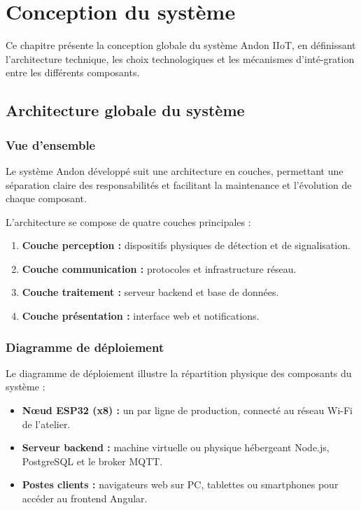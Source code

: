 \chapter{Conception du syst\`eme}

Ce chapitre pr\'esente la conception globale du syst\`eme Andon IIoT, en d\'efinissant l'architecture technique, les choix technologiques et les m\'ecanismes d'int\'e-gration entre les diff\'erents composants.

\section{Architecture globale du syst\`eme}

\subsection{Vue d'ensemble}

Le syst\`eme Andon d\'evelopp\'e suit une architecture en couches, permettant une s\'eparation claire des responsabilit\'es et facilitant la maintenance et l'\'evolution de chaque composant.

L'architecture se compose de quatre couches principales :

\begin{enumerate}
    \item \textbf{Couche perception :} dispositifs physiques de d\'etection et de signalisation.
    \item \textbf{Couche communication :} protocoles et infrastructure r\'eseau.
    \item \textbf{Couche traitement :} serveur backend et base de donn\'ees.
    \item \textbf{Couche pr\'esentation :} interface web et notifications.
\end{enumerate}


\subsection{Diagramme de d\'eploiement}

Le diagramme de d\'eploiement illustre la r\'epartition physique des composants du syst\`eme :

\begin{itemize}
    \item \textbf{N\oe{}ud ESP32 (x8) :} un par ligne de production, connect\'e au r\'eseau Wi-Fi de l'atelier.
    \item \textbf{Serveur backend :} machine virtuelle ou physique h\'ebergeant Node.js, PostgreSQL et le broker MQTT.
    \item \textbf{Postes clients :} navigateurs web sur PC, tablettes ou smartphones pour acc\'eder au frontend Angular.
\end{itemize}

